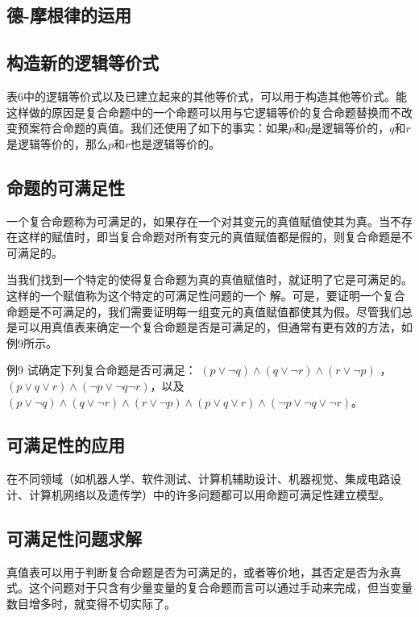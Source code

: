 \subsection{德-摩根律的运用}
\subsection{构造新的逻辑等价式}
表6中的逻辑等价式以及已建立起来的其他等价式，可以用于构造其他等价式。能这样做的原因是复合命题中的一个命题可以用与它逻辑等价的复合命题替换而不改变预案符合命题的真值。我们还使用了如下的事实：如果$p$和$q$是逻辑等价的，$q$和$r$是逻辑等价的，那么$p$和$r$也是逻辑等价的。
\subsection{命题的可满足性}
一个复合命题称为可满足的，如果存在一个对其变元的真值赋值使其为真。当不存在这样的赋值时，即当复合命题对所有变元的真值赋值都是假的，则复合命题是不可满足的。  

当我们找到一个特定的使得复合命题为真的真值赋值时，就证明了它是可满足的。这样的一个赋值称为这个特定的可满足性问题的一个 解。可是，要证明一个复合命题是不可满足的，我们需要证明每一组变元的真值赋值都使其为假。尽管我们总是可以用真值表来确定一个复合命题是否是可满足的，但通常有更有效的方法，如例9所示。  

例9  试确定下列复合命题是否可满足： $(p \lor  \neg q) \land (q \lor \neg r) \land (r \lor \neg p)$ ，$(p \lor q \lor r) \land (\neg p \lor \neg q \neg r)$，以及 $(p \lor \neg q) \land (q \lor \neg r) \land (r \lor \neg p) \land (p \lor q \lor r) \land (\neg p \lor \neg q \lor \neg r)$。

\subsection{可满足性的应用}
在不同领域（如机器人学、软件测试、计算机辅助设计、机器视觉、集成电路设计、计算机网络以及遗传学）中的许多问题都可以用命题可满足性建立模型。

\subsection{可满足性问题求解}
真值表可以用于判断复合命题是否为可满足的，或者等价地，其否定是否为永真式。这个问题对于只含有少量变量的复合命题而言可以通过手动来完成，但当变量数目增多时，就变得不切实际了。
